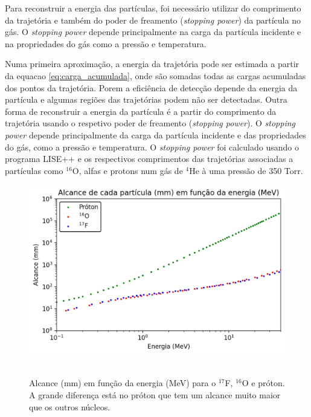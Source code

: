 \documentclass[a4paper,12pt,oneside]{book}
\begin{document}
\par Para reconstruir a energia das partículas, foi necessário utilizar do comprimento da trajetória e também do poder de freamento (\textit{stopping power}) \cite{DETC_TELE} da partícula no gás. O \textit{stopping power} depende principalmente na carga da partícula incidente e na propriedades do gás como a pressão e temperatura.

\par Numa primeira aproximação, a energia da trajetória pode ser estimada a partir da equacao \ref{eq:carga_acumulada}, onde são somadas todas as cargas acumuladas dos pontos da trajetória. Porem a eficiência de detecção depende da energia da partícula e algumas regiões das trajetórias podem não ser detectadas. Outra forma de reconstruir a energia da partícula é a partir do comprimento da trajetória usando o respetivo poder de freamento (\textit{stopping power}). O \textit{stopping power} depende principalmente da carga da partícula incidente e das propriedades do gás, como a pressão e temperatura. O \textit{stopping power} foi calculado usando o programa LISE++\cite{lise++} e os respectivos comprimentos das trajetórias associadas a partículas como $^{16}$O, alfas e protons num gás de $^4$He à uma pressão de 350 Torr.


 \begin{figure}[H]
     \centering
     \includegraphics[scale = 0.75]{figs/alcance_vs_energia_2.png}\
     \caption{Alcance (mm) em função da energia (MeV) para o $^{17}$F, $^{16}$O e próton. A grande diferença está no próton que tem um alcance muito maior que os outros núcleos.}
     \label{fig:alcance_vs_energia}
 \end{figure}
\end{document}
